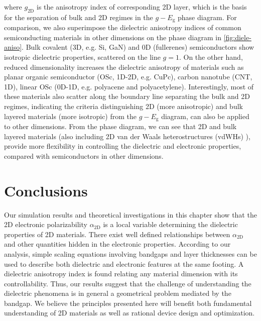where $g_{\mathrm{2D}}$ is the anisotropy index of corresponding 2D
layer, which is the basis for the separation of bulk and 2D regimes in
the $g-E_{\mathrm{g}}$ phase diagram.  For comparison, we also
superimpose the dielectric anisotropy indices of common semiconducting
materials in other dimensions on the phase diagram in
\autoref{fig:diele-aniso}. Bulk covalent (3D, e.g. Si, GaN) and 0D
(fullerenes) semiconductors show isotropic dielectric properties,
scattered on the line $g=1$. On the other hand, reduced dimensionality
increases the dielectric anisotropy of materials such as planar
organic semiconductor (OSc, 1D-2D, e.g. CuPc), carbon nanotube (CNT,
1D), linear OSc (0D-1D, e.g. polyacene and
polyacetylene). Interestingly, most of these materials also scatter
along the boundary line separating the bulk and 2D regimes, indicating
the criteria distinguishing 2D (more anisotropic) and bulk layered
materials (more isotropic) from the $g-E_{\mathrm{g}}$ diagram, can
also be applied to other dimensions. From the phase diagram, we can
see that 2D and bulk layered materials (also including 2D van der
Waals heterostructures (vdWHs) \cite{Novoselov_2016_vdW}), provide more
flexibility in controlling the dielectric and electronic properties,
compared with semiconductors in other dimensions.

%


\section{Conclusions}

Our simulation results and theoretical investigations in this chapter
show that the 2D electronic polarizability $\alpha_{\mathrm{2D}}$ is a
local variable determining the dielectric properties of 2D materials.
There exist well defined relationships between $\alpha_{\mathrm{2D}}$
and other quantities hidden in the electronic properties.  According
to our analysis, simple scaling equations involving bandgaps and layer
thicknesses can be used to describe both dielectric and electronic
features at the same footing. A dielectric anisotropy index is found
relating any material dimension with its controllability.  Thus, our
results suggest that the challenge of understanding the dielectric
phenomena is in general a geometrical problem mediated by the
bandgap. We believe the principles presented here will benefit both
fundamental understanding of 2D materials as well as rational device
design and optimization.




